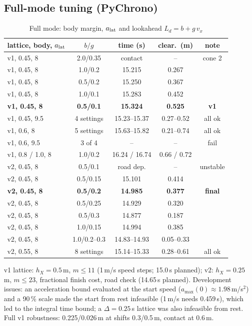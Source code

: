 \documentclass[conference]{IEEEtran}
\begin{document}
\subsection{Full-mode tuning (PyChrono)}
\begin{table}[h]
\centering
\caption{Full mode: body margin, $a_{\rm lat}$ and lookahead $L_d=b+g\,v_x$}
\label{tab:full}
\footnotesize
\setlength{\tabcolsep}{2.5pt}
\begin{tabular}{@{}lcccc@{}}
\toprule
lattice, body, $a_{\rm lat}$ & $b/g$ & time (s) & clear.\ (m) & note\\
\midrule
v1, 0.45, 8 & 2.0/0.35 & contact & -- & cone 2\\
v1, 0.45, 8 & 1.0/0.2 & 15.215 & 0.267 & \\
v1, 0.45, 8 & 0.5/0.2 & 15.250 & 0.367 & \\
v1, 0.45, 8 & 1.0/0.1 & 15.283 & 0.452 & \\
\textbf{v1, 0.45, 8} & \textbf{0.5/0.1} & \textbf{15.324} & \textbf{0.525} & \textbf{v1}\\
v1, 0.45, 9.5 & 4 settings & 15.23--15.37 & 0.27--0.52 & all ok\\
v1, 0.6, 8 & 5 settings & 15.63--15.82 & 0.21--0.74 & all ok\\
v1, 0.6, 9.5 & 3 of 4 & -- & -- & fail\\
v1, 0.8 / 1.0, 8 & 1.0/0.2 & 16.24 / 16.74 & 0.66 / 0.72 & \\
v2, 0.45, 8 & 0.5/0.1 & road dep. & -- & unstable\\
v2, 0.45, 8 & 0.5/0.15 & 15.101 & 0.414 & \\
\textbf{v2, 0.45, 8} & \textbf{0.5/0.2} & \textbf{14.985} & \textbf{0.377} & \textbf{final}\\
v2, 0.45, 8 & 0.5/0.25 & 14.929 & 0.320 & \\
v2, 0.45, 8 & 0.5/0.3 & 14.877 & 0.187 & \\
v2, 0.45, 8 & 1.0/0.15 & 14.994 & 0.385 & \\
v2, 0.45, 8 & 1.0/0.2--0.3 & 14.83--14.93 & 0.05--0.33 & \\
v2, 0.55, 8 & 8 settings & 15.14--15.33 & 0.28--0.61 & all ok\\
\bottomrule
\end{tabular}
\end{table}
v1 lattice: $h_X=0.5$\,m, $m\le11$ (1\,m/s speed steps; 15.0\,s planned);
v2: $h_X=0.25$\,m, $m\le23$, fractional finish cost, road check (14.65\,s
planned). Development issues: an acceleration bound evaluated at the start speed
($a_{\max}(0)\approx1.98$\,m/s$^2$) and a 90\,\% scale made the start from rest
infeasible (1\,m/s needs 0.459\,s), which led to the integral time bound; a
$\Delta=0.25$\,s lattice was also infeasible from rest. Full v1 robustness:
0.225/0.026\,m at shifts 0.3/0.5\,m, contact at 0.6\,m.
\end{document}
